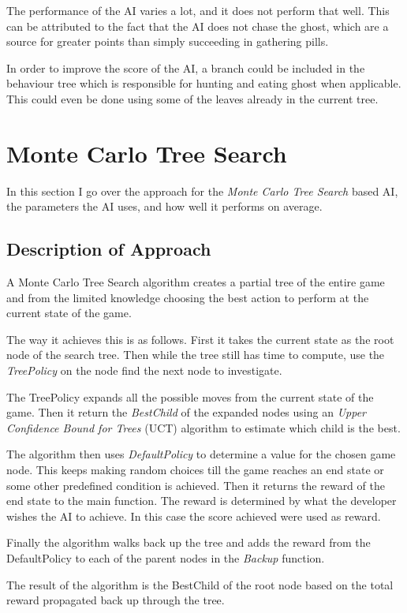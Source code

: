 \documentclass[conference,compsoc]{IEEEtran}
\begin{document}
The performance of the AI varies a lot, and it does not perform that well. This can be attributed to the fact that the AI does not chase the ghost, which are a source for greater points than simply succeeding in gathering pills. 

In order to improve the score of the AI, a branch could be included in the behaviour tree which is responsible for hunting and eating ghost when applicable. This could even be done using some of the leaves already in the current tree. 
\section{Monte Carlo Tree Search}
In this section I go over the approach for the \textit{Monte Carlo Tree Search} based AI, the parameters the AI uses, and how well it performs on average.
\subsection{Description of Approach}
A Monte Carlo Tree Search algorithm creates a partial tree of the entire game and from the limited knowledge choosing the best action to perform at the current state of the game. 

The way it achieves this is as follows. First it takes the current state as the root node of the search tree. Then while the tree still has time to compute, use the \textit{TreePolicy} on the node find the next node to investigate. 

The TreePolicy expands all the possible moves from the current state of the game. Then it return the \textit{BestChild} of the expanded nodes using an \textit{Upper Confidence Bound for Trees} (UCT) algorithm to estimate which child is the best.

The algorithm then uses \textit{DefaultPolicy} to determine a value for the chosen game node. This keeps making random choices till the game reaches an end state or some other predefined condition is achieved. Then it returns the reward of the end state to the main function. The reward is determined by what the developer wishes the AI to achieve. In this case the score achieved were used as reward.

Finally the algorithm walks back up the tree and adds the reward from the DefaultPolicy to each of the parent nodes in the \textit{Backup} function.

The result of the algorithm is the BestChild of the root node based on the total reward propagated back up through the tree.
\end{document}
